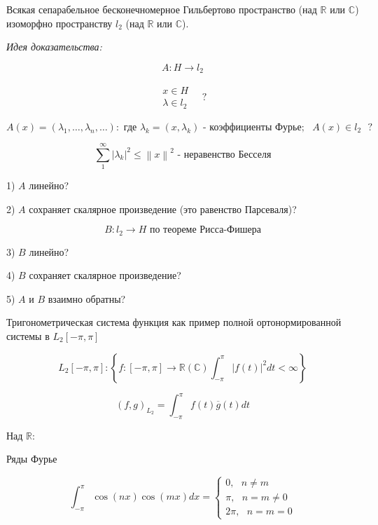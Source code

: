 \documentclass[12pt, a4paper]{report}
\begin{document}
\fi


\begin{theorem}
    Всякая сепарабельное бесконечномерное Гильбертово пространство (над \( \mathbb{R} \) или \( \mathbb{C} \)) изоморфно пространству \( l_2 \)  (над \( \mathbb{R} \) или \( \mathbb{C} \)).
\end{theorem}

\textit{Идея доказательства:} 

\[ A: H \to  l_2 \] 

\[ \begin{aligned}
\begin{aligned}
x \in  H \\ 
\lambda \in  l_2 
\end{aligned}
\quad ?
\end{aligned} \] 

\[ A(x )  = (\lambda_1, \ldots, \lambda_n, \ldots): \text{ где } \lambda_k = (x, \lambda_k ) \text{ - коэффициенты Фурье} ;\text{ } A(x )\in  l_2 \text{  } ?  \] 

\[ \sum_{1} ^{\infty  } \left\lvert \lambda_k        \right\rvert   ^2 \le \left\lVert x  \right\rVert ^2  \text{ - неравенство Бесселя} \] 

1) \( A  \)  линейно? 

2) \( A \) сохраняет скалярное произведение (это равенство Парсеваля)? 

\[ B : l_2 \to  H \text{ по теореме Рисса-Фишера}  \] 

3) \( B  \)  линейно? 

4) \( B \) сохраняет скалярное произведение?

5) \( A \)  и \( B  \)  взаимно обратны?

Тригонометрическая система функция как пример полной ортонормированной системы в \( L_2 [- \pi, \pi] \) 

\[ L_2[-\pi,\pi]:  \left\{ f: [-\pi, \pi ] \to  \mathbb{R}(\mathbb{C} ) \int_{-\pi }^{\pi}|f(t )  | ^2 dt < \infty   \right\}  \] 

\[ (f,g )_{L_2 } = \int_{- \pi }^{\pi} f(t) \overline{g } (t ) dt    \] 

Над \( \mathbb{R} \): 

Ряды Фурье

\[ \int_{- \pi }^{\pi } \cos (nx ) \cos (mx ) dx = \begin{cases}
0 , \text{ } n \neq m \\ 
\pi , \text{ } n = m \neq 0 \\ 
2\pi , \text{ }  n = m = 0
\end{cases}  \] 
\end{document}

